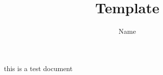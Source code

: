\documentclass[11pt]{article}
\title{Template}
\author{Name}
\begin{document}
\maketitle

this is a test document
\end{document}
